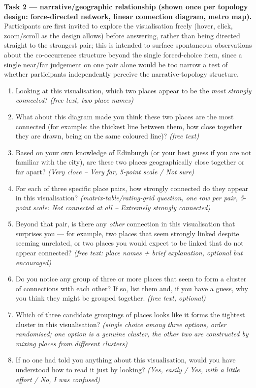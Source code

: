 \documentclass[logo,msc]{infthesis}
\begin{document}
\textbf{Task 2 --- narrative/geographic relationship (shown once per topology design: force-directed network, linear connection diagram, metro map).} Participants are first invited to explore the visualisation freely (hover, click, zoom/scroll as the design allows) before answering, rather than being directed straight to the strongest pair; this is intended to surface spontaneous observations about the co-occurrence structure beyond the single forced-choice item, since a single near/far judgement on one pair alone would be too narrow a test of whether participants independently perceive the narrative-topology structure.
\begin{enumerate}
  \item Looking at this visualisation, which two places appear to be the \emph{most strongly connected}? \emph{(free text, two place names)}
  \item What about this diagram made you think these two places are the most connected (for example: the thickest line between them, how close together they are drawn, being on the same coloured line)? \emph{(free text)}
  \item Based on your own knowledge of Edinburgh (or your best guess if you are not familiar with the city), are these two places geographically close together or far apart? \emph{(Very close -- Very far, 5-point scale / Not sure)}
  \item For each of three specific place pairs, how strongly connected do they appear in this visualisation? \emph{(matrix-table/rating-grid question, one row per pair, 5-point scale: Not connected at all -- Extremely strongly connected)}
  \item Beyond that pair, is there any \emph{other} connection in this visualisation that surprises you --- for example, two places that seem strongly linked despite seeming unrelated, or two places you would expect to be linked that do not appear connected? \emph{(free text: place names + brief explanation, optional but encouraged)}
  \item Do you notice any group of three or more places that seem to form a cluster of connections with each other? If so, list them and, if you have a guess, why you think they might be grouped together. \emph{(free text, optional)}
  \item Which of three candidate groupings of places looks like it forms the tightest cluster in this visualisation? \emph{(single choice among three options, order randomised; one option is a genuine cluster, the other two are constructed by mixing places from different clusters)}
  \item If no one had told you anything about this visualisation, would you have understood how to read it just by looking? \emph{(Yes, easily / Yes, with a little effort / No, I was confused)}
\end{enumerate}
\end{document}
